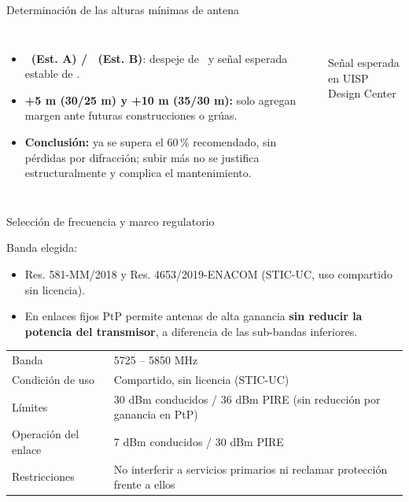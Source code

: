 \begin{frame}{Determinación de las alturas mínimas de antena}
  \begin{columns}[c]
    \small
    \begin{itemize}
      \item \textbf{\EBunoAlt\ (Est. A) / \EBdosAlt\ (Est. B)}: despeje de \EBdespejePct\ y
            señal esperada estable de \EBprxSim.
      \item \textbf{+5 m (30/25 m) y +10 m (35/30 m):} solo agregan margen ante futuras
            construcciones o grúas.
      \item \textbf{Conclusión:} ya se supera el 60\,\% recomendado, sin pérdidas por difracción; subir
            más no se justifica estructuralmente y complica el mantenimiento.
    \end{itemize}
    \centering
    \\
    {\scriptsize Señal esperada en UISP Design Center}
  \end{columns}
\end{frame}

\begin{frame}{Selección de frecuencia y marco regulatorio}
  \begin{block}{Banda elegida: \EBfrec}
    \begin{itemize}
      \item Res. 581-MM/2018 y Res. 4653/2019-ENACOM (STIC-UC, uso compartido sin licencia).
      \item En enlaces fijos PtP permite antenas de alta ganancia \textbf{sin reducir la potencia
            del transmisor}, a diferencia de las sub-bandas inferiores.
    \end{itemize}
  \end{block}
  \small
  \begin{tabularx}{\textwidth}{@{}lL@{}}
    \toprule
    Banda & 5725 -- 5850 MHz \\
    Condición de uso & Compartido, sin licencia (STIC-UC) \\
    Límites & 30 dBm conducidos / 36 dBm PIRE (sin reducción por ganancia en PtP) \\
    Operación del enlace & 7 dBm conducidos / 30 dBm PIRE \\
    Restricciones & No interferir a servicios primarios ni reclamar protección frente a ellos \\
    \bottomrule
  \end{tabularx}
\end{frame}

